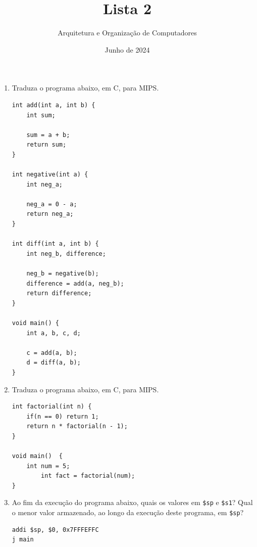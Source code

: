 \documentclass{article}
\title{\Huge Lista 2}
\author{\Large Arquitetura e Organização de Computadores}
\date{Junho de 2024}
\begin{document}
\large

\maketitle

\begin{enumerate}

\item Traduza o programa abaixo, em C, para MIPS.

\begin{center}
    \begin{minipage}{0.55\textwidth}
        \begin{lstlisting}[frame=single]
int add(int a, int b) {
    int sum;

    sum = a + b;
    return sum;
}

int negative(int a) {
    int neg_a;
    
    neg_a = 0 - a;
    return neg_a;
}

int diff(int a, int b) {
    int neg_b, difference;

    neg_b = negative(b);
    difference = add(a, neg_b);
    return difference;
}

void main() {
    int a, b, c, d;

    c = add(a, b);
    d = diff(a, b);
}
        \end{lstlisting}
    \end{minipage}
\end{center}
\pagebreak
\item Traduza o programa abaixo, em C, para MIPS.

\begin{center}
    \begin{minipage}{0.6\textwidth}
        \begin{lstlisting}[frame=single]
int factorial(int n) {
	if(n == 0) return 1;
	return n * factorial(n - 1);
}

void main()  {
	int num = 5;
        int fact = factorial(num);
}
        \end{lstlisting}
    \end{minipage}
\end{center}

\item Ao fim da execução do programa abaixo, quais os valores em \verb|$sp| e \verb|$s1|? Qual o menor valor armazenado, ao longo da execução deste programa, em \verb|$sp|?

\begin{center}
    \begin{minipage}{0.45\textwidth}
        \begin{lstlisting}[frame=single]
addi $sp, $0, 0x7FFFEFFC
j main


\end{lstlisting}
\end{minipage}
\end{center}
\end{enumerate}
\end{document}
